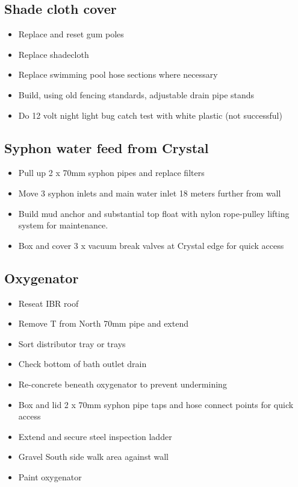 \subsection{Shade cloth cover}  
\begin{itemize}
\item Replace and reset gum poles  \checkmark
\item Replace shadecloth \checkmark 
\item Replace swimming pool hose sections where necessary \checkmark
\item Build, using old fencing standards, adjustable drain pipe stands
\item Do 12 volt night light bug catch test with white plastic \checkmark (not successful)
\end{itemize}


\subsection{Syphon water feed from Crystal}
\begin{itemize}
\item  Pull up 2 x 70mm syphon pipes and replace filters \checkmark
\item Move 3 syphon inlets and main water inlet 18 meters further from wall
\item Build mud anchor and substantial top float with nylon rope-pulley lifting system for maintenance.
\item Box and cover 3 x vacuum break valves at Crystal edge for quick access
\end{itemize}


\subsection{Oxygenator}
\begin{itemize}
\item Reseat IBR roof \checkmark
\item Remove T from North 70mm pipe and extend  \checkmark
\item Sort distributor tray or trays \checkmark
\item Check bottom of bath outlet drain \checkmark
\item Re-concrete beneath oxygenator to prevent undermining \checkmark
\item Box and lid 2 x 70mm syphon pipe taps and hose connect points for quick access 
\item Extend and secure steel inspection ladder
\item Gravel South side walk area against wall 
\item Paint oxygenator
\end{itemize}


